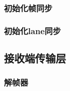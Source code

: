 \documentclass[UTF8]{ctexart}
\begin{document}
\subsubsection{初始化帧同步}

\subsubsection{初始化lane同步}

\subsection{接收端传输层}

\subsubsection{解帧器}


\end{document}
